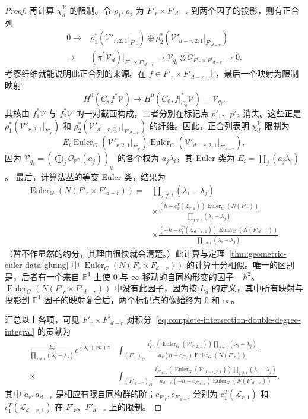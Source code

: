 \begin{proof}
再计算 $\widetilde\chi_d^{\mathcal V}$ 的限制。令 $\rho_1,\rho_2$ 为 $F'_r\times F'_{d-r}$ 到两个因子的投影，则有正合列
\[
\begin{aligned}
0\longrightarrow{}&\rho_1^*(\mathcal V'_{r,2,1}|_{F'_r})\oplus\rho_2^*(\mathcal V'_{d-r,2,1}|_{F'_{d-r}})\\
\longrightarrow{}&(\widetilde\pi^*\mathcal V_d)|_{F'_r\times F'_{d-r}}
\longrightarrow\mathcal V_{q_i}\otimes\mathcal O_{F'_r\times F'_{d-r}}\longrightarrow0.
\end{aligned}
\]
考察纤维就能说明此正合列的来源。在 $f\in F'_r\times F'_{d-r}$ 上，最后一个映射为限制映射
\[
H^0(C,f^*\mathcal V)\longrightarrow H^0(C_0,f|_{C_0}^*\mathcal V)=\mathcal V_{q_i}.
\]
其核由 $f_1^*\mathcal V$ 与 $f_2^*\mathcal V$ 的一对截面构成，二者分别在标记点 $p'_1$、$p'_2$ 消失。这些正是 $\rho_1^*(\mathcal V'_{r,2,1}|_{F'_r})$ 和 $\rho_2^*(\mathcal V'_{d-r,2,1}|_{F'_{d-r}})$ 的纤维。因此，正合列表明 $\widetilde\chi_d^{\mathcal V}$ 限制为
\[
E_i\operatorname{Euler}_G(\mathcal V'_{r,2,1}|_{F'_r})\operatorname{Euler}_G(\mathcal V'_{d-r,2,1}|_{F'_{d-r}}),
\]
因为 $\mathcal V_{q_i}=(\bigoplus_j\mathcal O_{\mathbb P^n}(a_j))_{q_i}$ 的各个权为 $a_j\lambda_i$，其 Euler 类为 $E_i=\prod_j(a_j\lambda_i)$。
最后，计算法丛的等变 Euler 类，结果为
\[
\begin{aligned}
\operatorname{Euler}_G(N(F'_r\times F'_{d-r}))={}&\prod_{j\ne i}(\lambda_i-\lambda_j)\\
&\times\frac{(\hbar-c_1^T(\mathcal L_{r,1}))\operatorname{Euler}_G(N(F'_r))}{\prod_{j\ne i}(\lambda_i-\lambda_j)}\\
&\times\frac{(-\hbar-c_1^T(\mathcal L_{d-r,1}))\operatorname{Euler}_G(N(F'_{d-r}))}{\prod_{j\ne i}(\lambda_i-\lambda_j)}.
\end{aligned}
\]
（暂不作显然的约分，其理由很快就会清楚。）此计算与定理~\ref{thm:geometric-euler-data-gluing} 中 $\operatorname{Euler}_G(N(F_r\times F_{d-r}))$ 的计算十分相似。唯一的区别是，后者有一个来自 $\mathbb P^1$ 上使 $0$ 与 $\infty$ 移动的自同构形变的因子 $-\hbar^2$。$\operatorname{Euler}_G(N(F'_r\times F'_{d-r}))$ 中没有此因子，因为按 $L_d$ 的定义，其中所有映射与投影到 $\mathbb P^1$ 因子的映射复合后，两个标记点的像始终为 $0$ 和 $\infty$。

汇总以上各项，可见 $F'_r\times F'_{d-r}$ 对积分~\eqref{eq:complete-intersection-double-degree-integral} 的贡献为
\[
\begin{aligned}
\frac{E_i}{\prod_{j\ne i}(\lambda_i-\lambda_j)}e^{(\lambda_i+r\hbar)z}
&\int_{(F'_r)_G}\frac{i_{F'_r}^*(\operatorname{Euler}_G(\mathcal V'_{r,2,1}))\prod_{j\ne i}(\lambda_i-\lambda_j)}{a_r(\hbar-c_{F'_r})\operatorname{Euler}_G(N(F'_r))}\\
\times{}&\int_{(F'_{d-r})_G}\frac{i_{F'_{d-r}}^*(\operatorname{Euler}_G(\mathcal V'_{d-r,2,1}))\prod_{j\ne i}(\lambda_i-\lambda_j)}{a_{d-r}(-\hbar-c_{F'_{d-r}})\operatorname{Euler}_G(N(F'_{d-r}))}.
\end{aligned}
\]
其中 $a_r,a_{d-r}$ 是相应有限自同构群的阶；$c_{F'_r},c_{F'_{d-r}}$ 分别为 $c_1^T(\mathcal L_{r,1})$ 和 $c_1^T(\mathcal L_{d-r,1})$ 在 $F'_r$、$F'_{d-r}$ 上的限制。


\end{proof}
